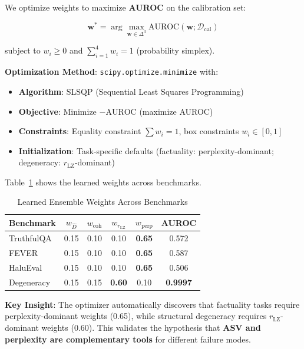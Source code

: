 \documentclass[11pt]{article}
\begin{document}
We optimize weights to maximize \textbf{AUROC} on the calibration set:

\begin{equation}
\mathbf{w}^* = \arg\max_{\mathbf{w} \in \Delta^3} \text{AUROC}(\mathbf{w}; \mathcal{D}_{\text{cal}})
\end{equation}

subject to $w_i \ge 0$ and $\sum_{i=1}^{4} w_i = 1$ (probability simplex).

\textbf{Optimization Method}: \texttt{scipy.optimize.minimize} with:
\begin{itemize}
\item \textbf{Algorithm}: SLSQP (Sequential Least Squares Programming)
\item \textbf{Objective}: Minimize $-\text{AUROC}$ (maximize AUROC)
\item \textbf{Constraints}: Equality constraint $\sum w_i = 1$, box constraints $w_i \in [0, 1]$
\item \textbf{Initialization}: Task-specific defaults (factuality: perplexity-dominant; degeneracy: $r_{\text{LZ}}$-dominant)
\end{itemize}

Table~\ref{tab:learned-weights} shows the learned weights across benchmarks.

\begin{table}[h]
\centering
\caption{Learned Ensemble Weights Across Benchmarks}
\label{tab:learned-weights}
\begin{tabular}{lccccc}
\toprule
\textbf{Benchmark} & $w_{\hat{D}}$ & $w_{\text{coh}}$ & $w_{r_{\text{LZ}}}$ & $w_{\text{perp}}$ & \textbf{AUROC} \\
\midrule
TruthfulQA  & 0.15 & 0.10 & 0.10 & \textbf{0.65} & 0.572 \\
FEVER       & 0.15 & 0.10 & 0.10 & \textbf{0.65} & 0.587 \\
HaluEval    & 0.15 & 0.10 & 0.10 & \textbf{0.65} & 0.506 \\
Degeneracy  & 0.15 & 0.15 & \textbf{0.60} & 0.10 & \textbf{0.9997} \\
\bottomrule
\end{tabular}
\end{table}

\textbf{Key Insight}: The optimizer automatically discovers that factuality tasks require perplexity-dominant weights (0.65), while structural degeneracy requires $r_{\text{LZ}}$-dominant weights (0.60). This validates the hypothesis that \textbf{ASV and perplexity are complementary tools} for different failure modes.
\end{document}

